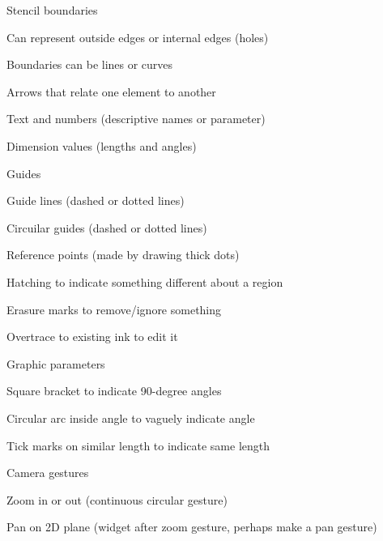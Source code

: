 \documentclass[12pt]{article}
\newenvironment{packed_enum}{
\begin{enumerate}
  \setlength{\itemsep}{1pt}
  \setlength{\parskip}{0pt}
  \setlength{\parsep}{0pt}
}{\end{enumerate}}
\begin{document}
\begin{packed_enum}
\item Stencil boundaries
  \begin{packed_enum}
  \item Can represent outside edges or internal edges (holes)
  \item Boundaries can be lines or curves
  \end{packed_enum}
\item Arrows that relate one element to another
\item Text and numbers (descriptive names or parameter)
\item Dimension values (lengths and angles)
\item Guides
  \begin{packed_enum}
  \item Guide lines (dashed or dotted lines)
  \item Circuilar guides (dashed or dotted lines)
  \item Reference points (made by drawing thick dots)
  \end{packed_enum}
\item Hatching to indicate something different about a region
\item Erasure marks to remove/ignore something
\item Overtrace to existing ink to edit it
\item Graphic parameters
  \begin{packed_enum}
  \item Square bracket to indicate 90-degree angles
  \item Circular arc inside angle to vaguely indicate angle
  \item Tick marks on similar length to indicate same length
  \end{packed_enum}
\item Camera gestures
  \begin{packed_enum}
  \item Zoom in or out (continuous circular gesture)
  \item Pan on 2D plane (widget after zoom gesture, perhaps make a pan gesture)
  \end{packed_enum}
\end{packed_enum}
\end{document}
